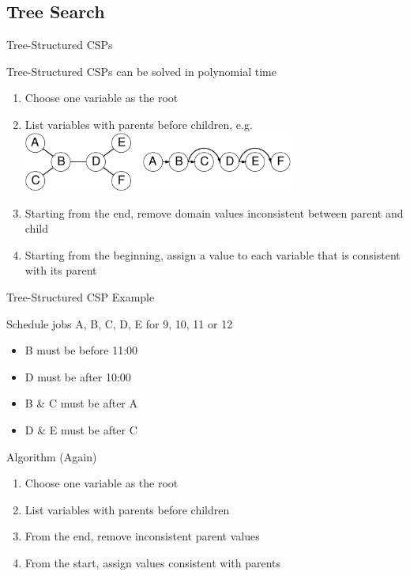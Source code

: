 \documentclass[12pt]{beamer}
\begin{document}
\subsection{Tree Search}
\begin{frame}{Tree-Structured CSPs}
	\begin{block}{Tree-Structured CSPs can be solved in polynomial time}
		\begin{enumerate}
			\item Choose one variable as the root
			\item List variables with parents before children, e.g.
				\includegraphics[width=3.5in]{tree-csp-2.pdf}
			\item Starting from the end, remove domain values inconsistent between parent and child
			\item Starting from the beginning, assign a value to each variable that is consistent with its parent
		\end{enumerate}
	\end{block}
\end{frame}
\begin{frame}{Tree-Structured CSP Example}
	\begin{block}{Schedule jobs A, B, C, D, E for 9, 10, 11 or 12}
		\begin{itemize}
			\item B must be before 11:00
			\item D must be after 10:00
			\item B \& C must be after A
			\item D \& E must be after C
		\end{itemize}
	\end{block}
	\begin{block}{Algorithm (Again)}
		\begin{enumerate}
			\item Choose one variable as the root
			\item List variables with parents before children
			\item From the end, remove inconsistent parent values
			\item From the start, assign values consistent with parents
		\end{enumerate}
	\end{block}
\end{frame}
\end{document}
